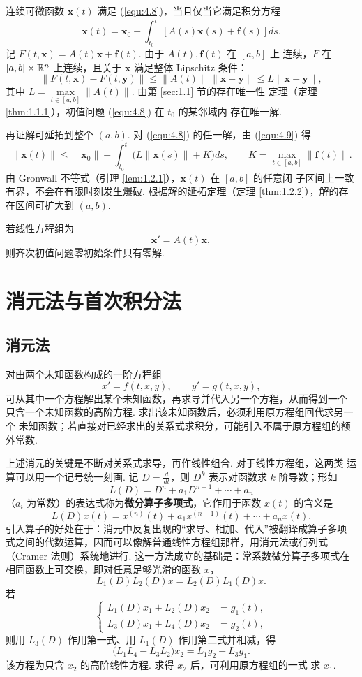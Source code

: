 \begin{pf1}
连续可微函数 $\bm{x}(t)$ 满足 (\ref{equ:4.8})，当且仅当它满足积分方程
\begin{equation}\label{equ:4.9}
\bm{x}(t)=\bm{x}_0+\int_{t_0}^{t}
\left[A(s)\bm{x}(s)+\bm{f}(s)\right]ds.
\end{equation}
记 $F(t,\bm{x})=A(t)\bm{x}+\bm{f}(t)$. 由于 $A(t),\bm{f}(t)$ 在 $[a,b]$ 上
连续，$F$ 在 $[a,b]\times\mathbb{R}^n$ 上连续，且关于 $\bm{x}$ 满足整体 Lipschitz
条件：
\[
\|F(t,\bm{x})-F(t,\bm{y})\|
\le\|A(t)\|\,\|\bm{x}-\bm{y}\|
\le L\|\bm{x}-\bm{y}\|,
\]
其中 $L=\max\limits_{t\in[a,b]}\|A(t)\|$. 由第 \ref{sec:1.1} 节的存在唯一性
定理（定理 \ref{thm:1.1.1}），初值问题 (\ref{equ:4.8}) 在 $t_0$ 的某邻域内
存在唯一解.

再证解可延拓到整个 $(a,b)$. 对 (\ref{equ:4.8}) 的任一解，由 (\ref{equ:4.9})
得
\[
\|\bm{x}(t)\|
\le\|\bm{x}_0\|+\int_{t_0}^{t}\bigl(L\|\bm{x}(s)\|+K\bigr)ds,
\qquad K=\max_{t\in[a,b]}\|\bm{f}(t)\|.
\]
由 Gronwall 不等式（引理 \ref{lem:1.2.1}），$\bm{x}(t)$ 在 $[a,b]$ 的任意闭
子区间上一致有界，不会在有限时刻发生爆破. 根据解的延拓定理（定理
\ref{thm:1.2.2}），解的存在区间可扩大到 $(a,b)$.
\end{pf1}

若线性方程组为
\[
\bm{x}'=A(t)\bm{x},
\]
则齐次初值问题零初始条件只有零解. 

\section{消元法与首次积分法}\label{sec:4.2}

\subsection{消元法}

对由两个未知函数构成的一阶方程组
\[
x'=f(t,x,y),\qquad y'=g(t,x,y),
\]
可从其中一个方程解出某个未知函数，再求导并代入另一个方程，从而得到一个
只含一个未知函数的高阶方程. 求出该未知函数后，必须利用原方程组回代求另一个
未知函数；若直接对已经求出的关系式求积分，可能引入不属于原方程组的额外常数.

上述消元的关键是不断对关系式求导，再作线性组合. 对于线性方程组，这两类
运算可以用一个记号统一刻画. 记 $D=\frac{d}{dt}$，则 $D^k$ 表示对函数求
$k$ 阶导数；形如
\[
L(D)=D^n+a_1D^{n-1}+\cdots+a_n
\]
（$a_i$ 为常数）的表达式称为\textbf{微分算子多项式}，它作用于函数 $x(t)$
的含义是
\[
L(D)x(t)=x^{(n)}(t)+a_1x^{(n-1)}(t)+\cdots+a_nx(t).
\]
引入算子的好处在于：消元中反复出现的“求导、相加、代入”被翻译成算子多项
式之间的代数运算，因而可以像解普通线性方程组那样，用消元法或行列式
（Cramer 法则）系统地进行. 这一方法成立的基础是：常系数微分算子多项式在
相同函数上可交换，即对任意足够光滑的函数 $x$，
\[
L_1(D)L_2(D)x=L_2(D)L_1(D)x.
\]
若
\[
\left\{
\begin{aligned}
L_1(D)x_1+L_2(D)x_2&=g_1(t),\\
L_3(D)x_1+L_4(D)x_2&=g_2(t),
\end{aligned}
\right.
\]
则用 $L_3(D)$ 作用第一式、用 $L_1(D)$ 作用第二式并相减，得
\begin{equation}\label{equ:4.10}
\bigl(L_1L_4-L_3L_2\bigr)x_2
=L_1g_2-L_3g_1.
\end{equation}
该方程为只含 $x_2$ 的高阶线性方程. 求得 $x_2$ 后，可利用原方程组的一式
求 $x_1$.

